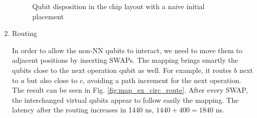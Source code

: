 \begin{enumerate}
\begin{figure}[H]


\caption{Qubit disposition in the chip layout with a naive initial placement}
\label{fig:map_ex_wrong_init}
\end{figure}

\item Routing
\label{sec:orgbffd944}

In order to allow the non-NN qubits to interact, we need to move them to adjacent positions by inserting SWAPs.
The mapping brings smartly the qubits close to the next operation qubit as well.
For example, it routes \(b\) next to \(a\) but also close to \(c\), avoiding a path increment for the next operation.
The result can be seen in Fig. \ref{fig:map_ex_circ_route}.
After every SWAP, the interchanged virtual qubits appear to follow easily the mapping.
The latency after the routing increases in 1440 ns, \(1440 + 400 = 1840\) ns.


\begin{figure}[H]
\centering
{}

\end{figure}
\end{enumerate}
